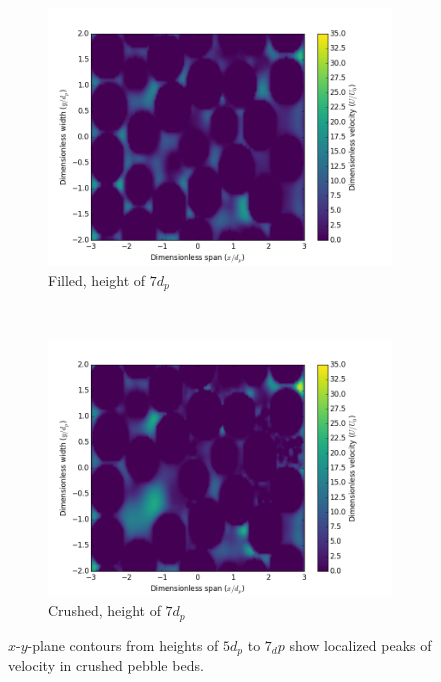 \begin{figure}[!ht]
    \begin{subfigure}[b]{0.44\textwidth}
        \includegraphics[width = \textwidth]{figures/lbm/cross-sections-filled/contour-140}
        \caption{Filled, height of $7d_p$}\label{fig:lbm-contours-filled-140}
    \end{subfigure}
    ~
    \begin{subfigure}[b]{0.44\textwidth}
        \includegraphics[width = \textwidth]{figures/lbm/cross-sections-crushed/contour-140}
        \caption{Crushed, height of $7d_p$}\label{fig:lbm-contours-crushed-140}
    \end{subfigure}
    \caption{$x$-$y$-plane contours from heights of $5d_p$ to $7_dp$ show localized peaks of velocity in crushed pebble beds.}\label{fig:lbm-contours-100-140}
\end{figure}


